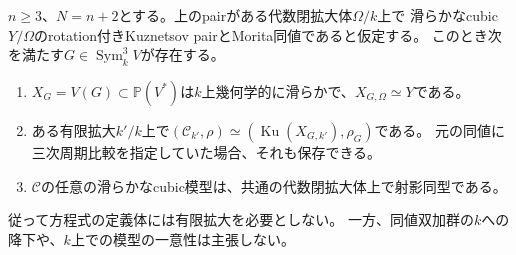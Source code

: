 \begin{theorem}[可換cubic模型の方程式は基礎体上に取れる]
\label{gcd:thm:field-model}
$n\ge3$、$N=n+2$とする。上のpairがある代数閉拡大体$\Omega/k$上で
滑らかなcubic $Y/\Omega$のrotation付きKuznetsov pairとMorita同値であると仮定する。
このとき次を満たす$G\in\operatorname{Sym}^3_k V$が存在する。
\begin{enumerate}
\item $X_G=V(G)\subset\mathbb P(V^*)$は$k$上幾何学的に滑らかで、$X_{G,\Omega}\simeq Y$である。
\item ある有限拡大$k'/k$上で$(\mathcal C_{k'},\rho)\simeq(\operatorname{Ku}(X_{G,k'}),\rho_G)$である。
元の同値に三次周期比較を指定していた場合、それも保存できる。
\item $\mathcal C$の任意の滑らかなcubic模型は、共通の代数閉拡大体上で射影同型である。
\end{enumerate}
従って方程式の定義体には有限拡大を必要としない。
一方、同値双加群の$k$への降下や、$k$上での模型の一意性は主張しない。
\end{theorem}
